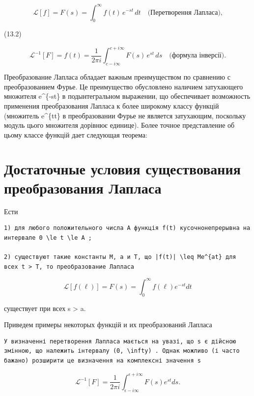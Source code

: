 \documentclass[
  ukrainian,
]{article}
\begin{document}
\[
\mathscr{L}[f] = F(s) = \int_{0}^{\infty} f(t) \, e^{-st} \, dt \quad \text{(Перетворення Лапласа),}
\]

(13.2)

\[
\mathscr{L}^{-1}[F] = f(t) = \frac{1}{2\pi i} \int_{c-i\infty}^{c+i\infty} F(s) \, e^{st} \, ds \quad \text{(формула інверсії).}
\]

Преобразование Лапласа обладает важным преимуществом по сравнению с
преобразованием Фурье. Це преимущество обусловлено наличием затухающего
множителя e\^{}\{-st\} в подынтегральном выражении, що обеспечивает
возможность применения преобразования Лапласа к более широкому классу
функцій (множитель e\^{}\{t\xi t\} в преобразовании Фурье не является
затухающим, поскольку модуль цього множителя дорівнює единице). Более
точное представление об цьому классе функцій дает следующая теорема:

\section{Достаточные условия существования преобразования
Лапласа}\label{ux434ux43eux441ux442ux430ux442ux43eux447ux43dux44bux435-ux443ux441ux43bux43eux432ux438ux44f-ux441ux443ux449ux435ux441ux442ux432ux43eux432ux430ux43dux438ux44f-ux43fux440ux435ux43eux431ux440ux430ux437ux43eux432ux430ux43dux438ux44f-ux43bux430ux43fux43bux430ux441ux430}

Ести

\begin{verbatim}
1) для любого положительного числа A функція f(t) кусочнонепрерывна на интервале 0 \le t \le A ;

2) существуют такие константы M, a и T, що |f(t)| \leq Me^{at} для всех t > T, то преобразование Лапласа
\end{verbatim}

\[
\mathscr{L}[f(\ell)] = F(s) = \int_{0}^{\infty} f(\ell) e^{-st} dt
\]

существует при всех s \textgreater{} a.

Приведем примеры некоторых функцій и их преобразований Лапласа

\begin{verbatim}
У визначенні перетворення Лапласа мається на увазі, що s є дійсною змінною, що належить інтервалу (0, \infty) . Однак можливо (і часто бажано) розширити це визначення на комплексні значення s
\end{verbatim}

\[
\mathscr{L}^{-1}[F] = \frac{1}{2\pi i} \int_{\epsilon - i\infty}^{\epsilon + i\infty} F(s) e^{st} ds.
\]
\end{document}
